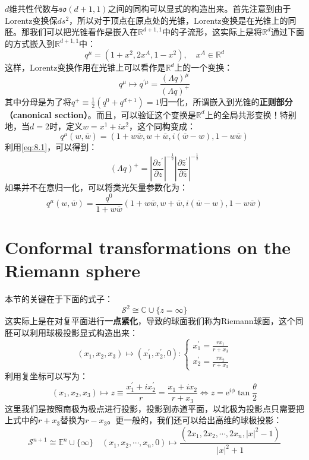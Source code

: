 	$d$维共性代数与$\mathfrak{so}(d+1,1)$之间的同构可以显式的构造出来\cite{Rychkov:2016iqz,Hugh}。首先注意到由于Lorentz变换保$ds^2$，所以对于顶点在原点处的光锥，Lorentz变换是在光锥上的同胚。那我们可以把光锥看作是嵌入在$\mathbb{R}^{d+1,1}$中的子流形，这实际上是将$\mathbb{R}^{d}$通过下面的方式嵌入到$\mathbb{R}^{d+1,1}$中：
	\begin{equation}
		q^{\mu}=(1+x^2,2x^A,1-x^2),\quad x^A\in\mathbb{R}^d
	\end{equation}
	这样，Lorentz变换作用在光锥上可以看作是$\mathbb{R}^d$上的一个变换：
	\begin{equation}
		q^\mu\mapsto q^{\prime\mu}=\frac{(\Lambda q)^\mu}{(\Lambda q)^+}
	\end{equation}
	其中分母是为了将$q^+\equiv\frac{1}{2}\left(q^0+q^{d+1}\right)=1$归一化，所谓嵌入到光锥的\textbf{正则部分（canonical section）}。而且，可以验证这个变换是$\mathbb{R}^d$上的全局共形变换！特别地，当$d=2$时，定义$w=x^1+ix^2$，这个同构变成：
	\begin{equation}
		q^\mu(w,\bar w)=(1+w\bar w,w+\bar w,i(\bar w-w),1-w\bar w)
	\end{equation}
	利用\ref{eq:8.1}，可以得到：
	$$(\Lambda q)^+=\left|\frac{\partial z^\prime}{\partial z}\right|^{-\frac{1}{2}}\left|\frac{\partial \bar z^\prime}{\partial \bar z}\right|^{-\frac{1}{2}}$$
	如果并不在意归一化，可以将类光矢量参数化为：
	\begin{equation}
		q^\mu(w,\bar w)=\frac{q^0}{1+w\bar w}(1+w\bar w,w+\bar w,i(\bar w-w),1-w\bar w)
	\end{equation}
\section{Conformal transformations on the Riemann sphere}
本节的关键在于下面的式子：
\begin{equation}
	\mathcal{S}^2\cong\mathbb{C}\cup\{z=\infty\}
\end{equation}
这实际上是在对复平面进行\textbf{一点紧化}，导致的球面我们称为Riemann球面，这个同胚可以利用球极投影显式构造出来：
\begin{equation}
	(x_1,x_2,x_3)\mapsto(x_1^{\prime},x_2^{\prime},0):\begin{cases}
		x_1^{\prime}=\frac{rx_1}{r+x_3}\\
		x_2^{\prime}=\frac{rx_2}{r+x_3}
	\end{cases}
\end{equation}
利用复坐标可以写为：
\begin{equation}
	(x_1,x_2,x_3)\mapsto z\equiv\frac{x_1^{\prime}+ix_2^{\prime}}{r}=\frac{x_1+ix_2}{r+x_3}\iff z=\mathrm{e}^{i\phi}\tan\frac{\theta}{2}
\end{equation}
这里我们是按照南极为极点进行投影，投影到赤道平面，以北极为投影点只需要把上式中的$r+x_3$替换为$r-x_3$。更一般的，我们还可以给出高维的球极投影：
\begin{equation}
	\mathcal{S}^{n+1}\cong{\mathbb{E}^{n}\cup\{\infty\}}
	\quad(x_1, x_2, \cdots, x_n,0) \mapsto\frac{(2x_1, 2x_2, \cdots, 2x_n, |x|^2 - 1)}{|x|^2 + 1}
\end{equation}

